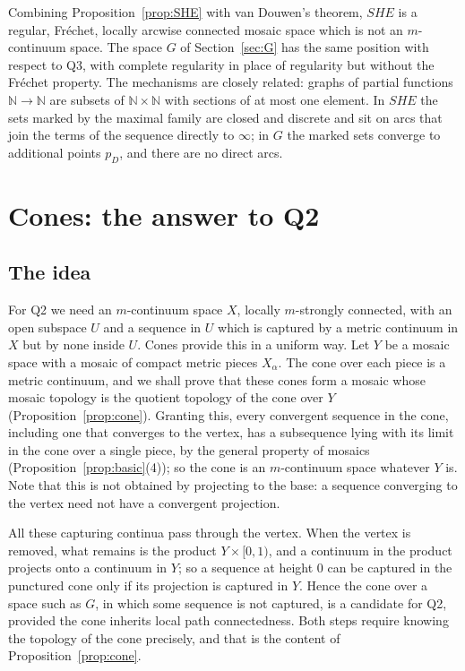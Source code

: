 \documentclass[11pt]{amsart}
\theoremstyle{definition}
\theoremstyle{remark}
\newcommand{\N}{\mathbb{N}}
\newcommand{\SHE}{\mathit{SHE}}
\numberwithin{equation}{section}
\begin{document}
Combining Proposition~\ref{prop:SHE} with van Douwen's theorem, $\SHE$ is a regular, Fr\'echet, locally arcwise connected mosaic space which is not an $m$-continuum space. The space $G$ of Section~\ref{sec:G} has the same position with respect to Q3, with complete regularity in place of regularity but without the Fr\'echet property. The mechanisms are closely related: graphs of partial functions $\N\to\N$ are subsets of $\N\times\N$ with sections of at most one element. In $\SHE$ the sets marked by the maximal family are closed and discrete and sit on arcs that join the terms of the sequence directly to $\infty$; in $G$ the marked sets converge to additional points $p_D$, and there are no direct arcs.

\section{Cones: the answer to Q2}\label{sec:cones}

\subsection{The idea}
For Q2 we need an $m$-continuum space $X$, locally $m$-strongly connected, with an open subspace $U$ and a sequence in $U$ which is captured by a metric continuum in $X$ but by none inside $U$. Cones provide this in a uniform way. Let $Y$ be a mosaic space with a mosaic of compact metric pieces $X_\alpha$. The cone over each piece is a metric continuum, and we shall prove that these cones form a mosaic whose mosaic topology is the quotient topology of the cone over $Y$ (Proposition~\ref{prop:cone}). Granting this, every convergent sequence in the cone, including one that converges to the vertex, has a subsequence lying with its limit in the cone over a single piece, by the general property of mosaics (Proposition~\ref{prop:basic}(4)); so the cone is an $m$-continuum space whatever $Y$ is. Note that this is not obtained by projecting to the base: a sequence converging to the vertex need not have a convergent projection.

All these capturing continua pass through the vertex. When the vertex is removed, what remains is the product $Y\times[0,1)$, and a continuum in the product projects onto a continuum in $Y$; so a sequence at height $0$ can be captured in the punctured cone only if its projection is captured in $Y$. Hence the cone over a space such as $G$, in which some sequence is not captured, is a candidate for Q2, provided the cone inherits local path connectedness. Both steps require knowing the topology of the cone precisely, and that is the content of Proposition~\ref{prop:cone}.
\end{document}
